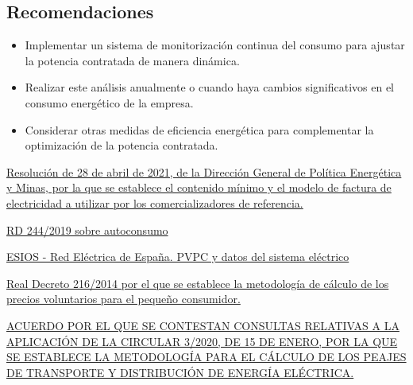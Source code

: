 \documentclass[a4paper,10pt,twocolumn]{article}
\begin{document}
\begin{Form}
\section{Recomendaciones}
\begin{itemize}
    \item Implementar un sistema de monitorización continua del consumo para ajustar la potencia contratada de manera dinámica.
    \item Realizar este análisis anualmente o cuando haya cambios significativos en el consumo energético de la empresa.
    \item Considerar otras medidas de eficiencia energética para complementar la optimización de la potencia contratada.
\end{itemize}
















\begin{thebibliography}{99}
     \href{https://www.boe.es/buscar/pdf/2021/BOE-A-2021-7120-consolidado.pdf}{Resolución de 28 de abril de 2021, de la Dirección General de Política Energética y Minas, por la que se establece el contenido
mínimo y el modelo de factura de electricidad a utilizar por los comercializadores de referencia.}


\href{}{RD 244/2019  sobre autoconsumo}

\href{https://www.esios.ree.es/es/pvpc}{ESIOS - Red Eléctrica de España. PVPC y datos del sistema eléctrico
}


\href{}{Real Decreto 216/2014 por el que se establece la metodología de cálculo de los precios voluntarios para el pequeño consumidor.}


\href{https://www.cnmc.es/sites/default/files/3416756_135.pdf}{ACUERDO POR EL QUE SE CONTESTAN CONSULTAS RELATIVAS A LA
APLICACIÓN DE LA CIRCULAR 3/2020, DE 15 DE ENERO, POR LA QUE SE
ESTABLECE LA METODOLOGÍA PARA EL CÁLCULO DE LOS PEAJES DE
TRANSPORTE Y DISTRIBUCIÓN DE ENERGÍA ELÉCTRICA.}




\end{thebibliography}









\end{Form}
\end{document}
